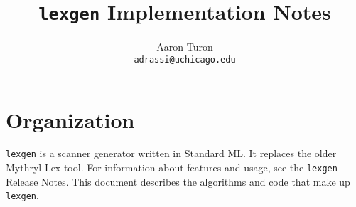 
\usepackage[top=1.25in, bottom=1.25in, left=1.33in, right=1.33in]{geometry}
\usepackage{amsmath}
\usepackage[all]{xy}
\usepackage{graphicx}

\newcommand{\flex}{\texttt{lexgen}}

\title{\flex{} Implementation Notes}
\author{Aaron Turon\\
\texttt{adrassi@uchicago.edu}}

\newcommand{\Carat}{\^{ }}
\newcommand{\RE}{r}
\newcommand{\OR}{\ | \ }
\newcommand{\AND}{\ \& \ }
\newcommand{\CL}{\mathcal{L}}
\newcommand{\CS}{\mathcal{S}}
\newcommand{\CR}{\mathcal{R}}
\newcommand{\CP}{\mathcal{P}}
\newcommand{\Sem}[1]{[ \! [ #1 ] \! ]}
\newcommand{\Ls}[1]{\CL\Sem{#1}}

\newcommand{\eg}{{\em e.g.}}
\newcommand{\cf}{{\em cf.}}
\newcommand{\ie}{{\em i.e.}}

\newcommand{\nm}[1]{\texttt{#1}}

\newcommand{\New}[1]{\emph{\textbf{#1}}}

\newcommand{\Grammar}[1]{\[ \begin{array}{rcll} #1 \end{array} \]}
\newcommand{\GFirst}[3]{#1 & ::= & #2 & \textrm{#3} \\ }
\newcommand{\GNext}[2]{ & | & #1 & \textrm{#2} \\ }

\usepackage{amsthm}

\newtheorem*{theorem}{Theorem}
\newtheorem*{definition}{Definition}
\newtheorem*{remark}{Remark}

\usepackage{ifpdf}

\usepackage{palatino}
\renewcommand{\ttdefault}{cmtt}



\maketitle
\tableofcontents

\newpage
\section{Organization}

\flex{} is a scanner generator written in Standard ML.  It replaces the older
Mythryl-Lex tool.  For information about features and usage, see the \flex{} 
Release Notes.  This document describes the algorithms and code that make up
\flex{}.

